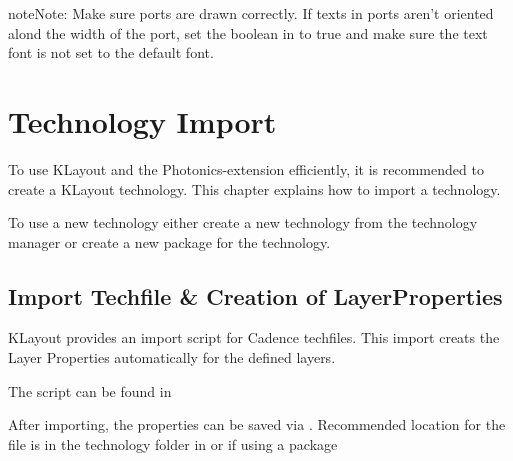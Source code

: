 \documentclass[a4paper,10pt,english]{sphinxmanual}
\begin{document}
\begin{sphinxadmonition}{note}{Note:}
Make sure ports are drawn correctly. If texts in ports aren’t oriented alond the width of the port, set the boolean
 in  to true
and make sure the text font is not set to the default font.
\end{sphinxadmonition}


\chapter{Technology Import}
\label{\detokenize{photonics/techfile:technology-import}}\label{\detokenize{photonics/techfile::doc}}
To use KLayout and the Photonics-extension efficiently, it is recommended to create a KLayout technology. This chapter explains how to import a technology.

To use a new technology either create a new technology from the technology manager  or create a new package
 for the technology.


\section{Import Techfile \& Creation of LayerProperties}
\label{\detokenize{photonics/techfile:import-techfile-creation-of-layerproperties}}
KLayout provides an import script for Cadence techfiles. This import creats the Layer Properties automatically for the defined layers.

The script can be found in 

After importing, the properties can be saved via . Recommended location for the file is in the technology folder in  or if using a package
\end{document}
